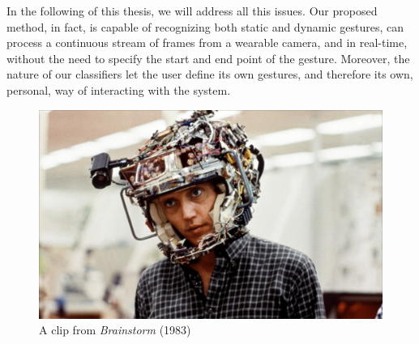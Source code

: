 In the following of this thesis, we will address all this issues. Our proposed method, in fact, is capable of recognizing both static and dynamic gestures, can process a continuous stream of frames from a wearable camera, and in real-time, without the need to specify the start and end point of the gesture. Moreover, the nature of our classifiers let the user define its own gestures, and therefore its own, personal, way of interacting with the system.

\begin{figure}[t!]
\centering
\includegraphics[width=0.6\linewidth]{Figures/brainstorm-Walken.jpg}
\caption{A clip from \textit{Brainstorm} (1983)}
\label{fig:brainstorm}
\end{figure}